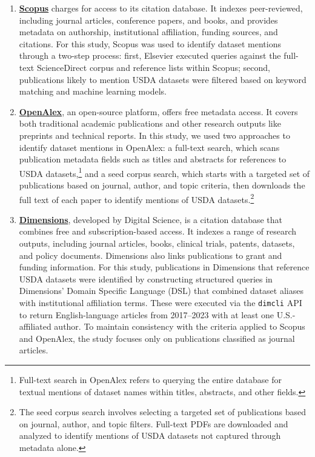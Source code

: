\documentclass[
  letterpaper,
  DIV=11,
  numbers=noendperiod]{scrartcl}
\begin{document}
\begin{enumerate}
\def\labelenumi{\arabic{enumi}.}
\item
  \href{appendices/app_databases.qmd\#sec-scopus}{\textbf{Scopus}}
  charges for access to its citation database. It indexes peer-reviewed,
  including journal articles, conference papers, and books, and provides
  metadata on authorship, institutional affiliation, funding sources,
  and citations. For this study, Scopus was used to identify dataset
  mentions through a two-step process: first, Elsevier executed queries
  against the full-text ScienceDirect corpus and reference lists within
  Scopus; second, publications likely to mention USDA datasets were
  filtered based on keyword matching and machine learning models.
\item
  \href{appendices/app_databases.qmd\#sec-openalex}{\textbf{OpenAlex}},
  an open-source platform, offers free metadata access. It covers both
  traditional academic publications and other research outputs like
  preprints and technical reports. In this study, we used two approaches
  to identify dataset mentions in OpenAlex: a full-text search, which
  scans publication metadata fields such as titles and abstracts for
  references to USDA datasets,\footnote{Full-text search in OpenAlex
    refers to querying the entire database for textual mentions of
    dataset names within titles, abstracts, and other fields.} and a
  seed corpus search, which starts with a targeted set of publications
  based on journal, author, and topic criteria, then downloads the full
  text of each paper to identify mentions of USDA datasets.\footnote{The
    seed corpus search involves selecting a targeted set of publications
    based on journal, author, and topic filters. Full-text PDFs are
    downloaded and analyzed to identify mentions of USDA datasets not
    captured through metadata alone.}
\item
  \href{appendices/app_databases.qmd\#sec-dimensions}{\textbf{Dimensions}},
  developed by Digital Science, is a citation database that combines
  free and subscription-based access. It indexes a range of research
  outputs, including journal articles, books, clinical trials, patents,
  datasets, and policy documents. Dimensions also links publications to
  grant and funding information. For this study, publications in
  Dimensions that reference USDA datasets were identified by
  constructing structured queries in Dimensions' Domain Specific
  Language (DSL) that combined dataset aliases with institutional
  affiliation terms. These were executed via the \texttt{dimcli} API to
  return English-language articles from 2017--2023 with at least one
  U.S.-affiliated author. To maintain consistency with the criteria
  applied to Scopus and OpenAlex, the study focuses only on publications
  classified as journal articles.
\end{enumerate}
\end{document}

